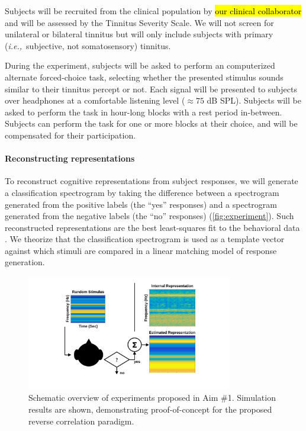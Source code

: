 \documentclass[11pt, notitlepage]{article} %
\def\ie{{\emph{i.e.,}}~}
\begin{document}
Subjects will be recruited from the clinical population by \hl{our clinical collaborator}
and will be assessed by the Tinnitus Severity Scale.
We will not screen for unilateral or bilateral tinnitus but will only include subjects
with primary (\ie subjective, not somatosensory) tinnitus.

During the experiment, subjects will be asked to perform an computerized alternate forced-choice task,
selecting whether the presented stimulus sounds similar to their tinnitus percept or not.
Each signal will be presented to subjects over headphones
at a comfortable listening level ($\approx 75$ dB SPL).
Subjects will be asked to perform the task in hour-long blocks with a rest period in-between.
Subjects can perform the task for one or more blocks at their choice,
and will be compensated for their participation.

\paragraph{Reconstructing representations}

To reconstruct cognitive representations from subject responses,
we will generate a classification spectrogram by taking the difference
between a spectrogram generated from the positive labels (the ``yes'' responses)
and a spectrogram generated from the negative labels (the ``no'' responses)
(\autoref{fig:experiment}).
Such reconstructed representations are the best least-squares fit to the behavioral data
\cite{gosselinSuperstitiousPerceptionsReveal2003}.
We theorize that the classification spectrogram is used as a template vector
against which stimuli are compared in a linear matching model of response generation.

\begin{figure}[h] %
	\centering
	\includegraphics[width=0.8\textwidth]{Figures/Figures_tinnitus_3.png}
	\caption{Schematic overview of experiments proposed in Aim \#1.
	Simulation results are shown, demonstrating proof-of-concept
	for the proposed reverse correlation paradigm.}
	\label{fig:experiment}
\end{figure}
\end{document}
